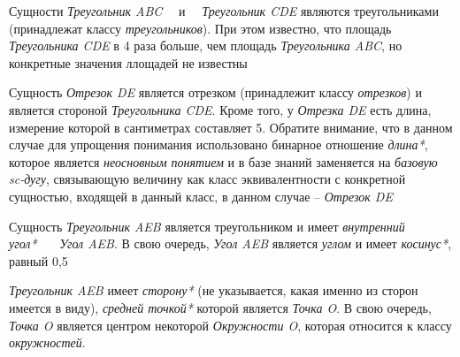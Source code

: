 \begin{SCn}
\begin{scnstruct}
\begin{scnsubstruct}
\begin{scnset}
{{\begin{scnitemize}
                \item{Сущности \textit{Треугольник ABC}~~ и ~~\textit{Треугольник CDE} являются треугольниками (принадлежат классу \textit{треугольников}). При этом известно, что площадь \textit{Треугольника CDE} в 4 раза больше, чем площадь \textit{Треугольника ABC}, но конкретные значения ллощадей не известны}\item{Сущность \textit{Отрезок DE} является отрезком (принадлежит классу \textit{отрезков}) и является стороной \textit{Треугольника CDE}. Кроме того, у \textit{Отрезка DE} есть длина, измерение которой в сантиметрах составляет 5. Обратите внимание, что в данном случае для упрощения понимания использовано бинарное отношение \textit{длина*}, которое является \textit{неосновным понятием} и в базе знаний заменяется на \textit{базовую sc-дугу}, связывающую величину как класс эквивалентности с конкретной сущностью, входящей в данный класс, в данном случае -- \textit{Отрезок DE}  }\item{Сущность \textit{Треугольник AEB} является треугольником и имеет \textit{внутренний угол*}~~~ \textit{Угол AEB}. В свою очередь, \textit{Угол AEB} является \textit{углом} и имеет \textit{косинус*}, равный 0,5}\item{\textit{Треугольник AEB} имеет \textit{сторону*} (не указывается, какая именно из сторон имеется в виду), \textit{средней точкой*} которой является \textit{Точка O}. В свою очередь, \textit{Точка O} является центром некоторой \textit{Окружности O}, которая относится к классу \textit{окружностей}.}\end{scnitemize}
                }\newpage}
            \end{scnset}
            \bigskip
        \end{scnsubstruct}
        \scnendsegmentcomment
        

\end{scnstruct}
\end{SCn}

